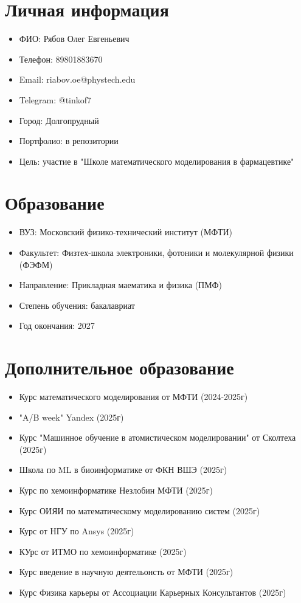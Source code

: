 \documentclass[a4paper, 12pt]{article}
\begin{document}
\section{Личная информация}
\begin{itemize}
    \item ФИО: Рябов Олег Евгеньевич
    \item Телефон: 89801883670
    \item Email: riabov.oe@phystech.edu
    \item Telegram: @tinkof7
    \item Город: Долгопрудный
    \item Портфолио: в репозитории
    \item Цель: участие в "Школе математического моделирования в фармацевтике"
\end{itemize}	

\section{Образование}
\begin{itemize}
    \item ВУЗ: Московский физико-технический институт (МФТИ)
    \item Факультет: Физтех-школа электроники, фотоники и молекулярной физики (ФЭФМ)
    \item Направление: Прикладная маематика и физика (ПМФ)
    \item Степень обучения: бакалавриат
    \item Год окончания: 2027 
\end{itemize}

\section{Дополнительное образование}
\begin{itemize}
    \item Курс математического моделирования от МФТИ (2024-2025г)
    \item "A/B week" Yandex (2025г)
    \item Курс "Машинное обучение в атомистическом моделировании" от Сколтеха (2025г)
    \item Школа по ML в биоинформатике от ФКН ВШЭ (2025г)
    \item Курс по хемоинформатике Незлобин МФТИ (2025г)
    \item Курс ОИЯИ по математическому моделированию систем (2025г)
    \item Курс от НГУ по Ansys (2025г)
    \item КУрс от ИТМО по хемоинформатике (2025г)
    \item Курс введение в научную деятельонсть от МФТИ (2025г)
    \item Курс Физика карьеры от Ассоциации Карьерных Консультантов (2025г)
\end{itemize}
\end{document}
